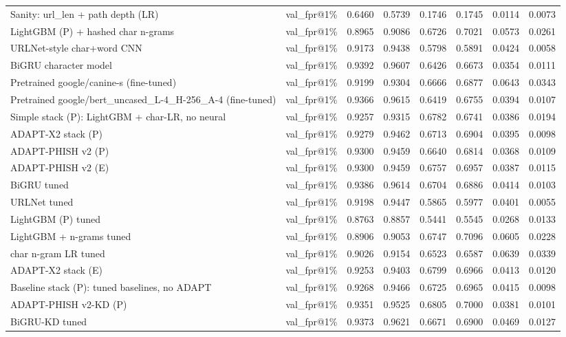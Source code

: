 \begin{table}[t]
\begin{tabular}{llrrrrrr}
Sanity: url\_len + path depth (LR) & val\_fpr@1\% & 0.6460 & 0.5739 & 0.1746 & 0.1745 & 0.0114 & 0.0073 \\
LightGBM (P) + hashed char n-grams & val\_fpr@1\% & 0.8965 & 0.9086 & 0.6726 & 0.7021 & 0.0573 & 0.0261 \\
URLNet-style char+word CNN & val\_fpr@1\% & 0.9173 & 0.9438 & 0.5798 & 0.5891 & 0.0424 & 0.0058 \\
BiGRU character model & val\_fpr@1\% & 0.9392 & 0.9607 & 0.6426 & 0.6673 & 0.0354 & 0.0111 \\
Pretrained google/canine-s (fine-tuned) & val\_fpr@1\% & 0.9199 & 0.9304 & 0.6666 & 0.6877 & 0.0643 & 0.0343 \\
Pretrained google/bert\_uncased\_L-4\_H-256\_A-4 (fine-tuned) & val\_fpr@1\% & 0.9366 & 0.9615 & 0.6419 & 0.6755 & 0.0394 & 0.0107 \\
Simple stack (P): LightGBM + char-LR, no neural & val\_fpr@1\% & 0.9257 & 0.9315 & 0.6782 & 0.6741 & 0.0386 & 0.0194 \\
ADAPT-X2 stack (P) & val\_fpr@1\% & 0.9279 & 0.9462 & 0.6713 & 0.6904 & 0.0395 & 0.0098 \\
ADAPT-PHISH v2 (P) & val\_fpr@1\% & 0.9300 & 0.9459 & 0.6640 & 0.6814 & 0.0368 & 0.0109 \\
ADAPT-PHISH v2 (E) & val\_fpr@1\% & 0.9300 & 0.9459 & 0.6757 & 0.6957 & 0.0387 & 0.0115 \\
BiGRU tuned & val\_fpr@1\% & 0.9386 & 0.9614 & 0.6704 & 0.6886 & 0.0414 & 0.0103 \\
URLNet tuned & val\_fpr@1\% & 0.9198 & 0.9447 & 0.5865 & 0.5977 & 0.0401 & 0.0055 \\
LightGBM (P) tuned & val\_fpr@1\% & 0.8763 & 0.8857 & 0.5441 & 0.5545 & 0.0268 & 0.0133 \\
LightGBM + n-grams tuned & val\_fpr@1\% & 0.8906 & 0.9053 & 0.6747 & 0.7096 & 0.0605 & 0.0228 \\
char n-gram LR tuned & val\_fpr@1\% & 0.9026 & 0.9154 & 0.6523 & 0.6587 & 0.0639 & 0.0339 \\
ADAPT-X2 stack (E) & val\_fpr@1\% & 0.9253 & 0.9403 & 0.6799 & 0.6966 & 0.0413 & 0.0120 \\
Baseline stack (P): tuned baselines, no ADAPT & val\_fpr@1\% & 0.9268 & 0.9466 & 0.6725 & 0.6965 & 0.0415 & 0.0098 \\
ADAPT-PHISH v2-KD (P) & val\_fpr@1\% & 0.9351 & 0.9525 & 0.6805 & 0.7000 & 0.0381 & 0.0101 \\
BiGRU-KD tuned & val\_fpr@1\% & 0.9373 & 0.9621 & 0.6671 & 0.6900 & 0.0469 & 0.0127 \\

\end{tabular}
\end{table}
